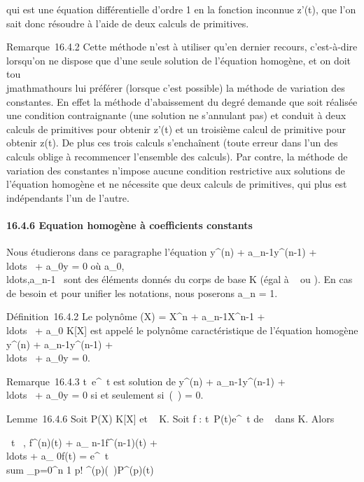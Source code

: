 \documentclass[]{article}
\begin{document}
qui est une équation différentielle d'ordre 1 en la fonction inconnue
z'(t), que l'on sait donc résoudre à l'aide de deux calculs de
primitives.

Remarque~16.4.2 Cette méthode n'est à utiliser qu'en dernier recours,
c'est-à-dire lorsqu'on ne dispose que d'une seule solution de l'équation
homogène, et on doit tou\\jmathmathours lui préférer (lorsque c'est possible) la
méthode de variation des constantes. En effet la méthode d'abaissement
du degré demande que soit réalisée une condition contraignante (une
solution ne s'annulant pas) et conduit à deux calculs de primitives pour
obtenir z'(t) et un troisième calcul de primitive pour obtenir z(t). De
plus ces trois calculs s'enchaînent (toute erreur dans l'un des calculs
oblige à recommencer l'ensemble des calculs). Par contre, la méthode de
variation des constantes n'impose aucune condition restrictive aux
solutions de l'équation homogène et ne nécessite que deux calculs de
primitives, qui plus est indépendants l'un de l'autre.

\paragraph{16.4.6 Equation homogène à coefficients constants}

Nous étudierons dans ce paragraphe l'équation y^(n) +
a_n-1y^(n-1) +
\\ldots~ +
a_0y = 0 où
a_0,\\ldots,a_n-1~
sont des éléments donnés du corps de base K (égal à ~ ou ). En cas de
besoin et pour unifier les notations, nous poserons a_n = 1.

Définition~16.4.2 Le polynôme \chi(X) = X^n +
a_n-1X^n-1 +
\\ldots~ +
a_0 \in K{[}X{]} est appelé le polynôme caractéristique de
l'équation homogène y^(n) + a_n-1y^(n-1)
+ \\ldots~ +
a_0y = 0.

Remarque~16.4.3 t\mapsto~e^\lambda~t est
solution de y^(n) + a_n-1y^(n-1) +
\\ldots~ +
a_0y = 0 si et seulement si~\chi(\lambda~) = 0.

Lemme~16.4.6 Soit P(X) \in K{[}X{]} et \lambda~ \in K. Soit f :
t\mapsto~P(t)e^\lambda~t de ~ dans K. Alors

\forall~t \in {}~, f^(n)(t) + a_
n-1f^(n-1)(t) +
\\ldots + a_
0f(t) = e^\lambda~t \\sum
_p=0^n 1 \over p!
\chi^(p)(\lambda~)P^(p)(t)
\end{document}
